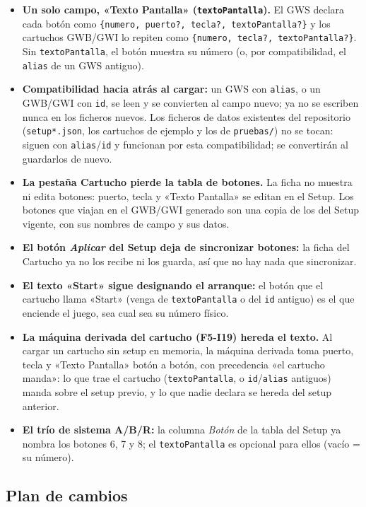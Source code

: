 \begin{itemize}
	\item \textbf{Un solo campo, «Texto Pantalla» (\texttt{textoPantalla}).} El GWS declara cada botón como \texttt{\{numero, puerto?, tecla?, textoPantalla?\}} y los cartuchos GWB/GWI lo repiten como \texttt{\{numero, tecla?, textoPantalla?\}}. Sin \texttt{textoPantalla}, el botón muestra su número (o, por compatibilidad, el \texttt{alias} de un GWS antiguo).
	\item \textbf{Compatibilidad hacia atrás al cargar:} un GWS con \texttt{alias}, o un GWB/GWI con \texttt{id}, se leen y se convierten al campo nuevo; ya no se escriben nunca en los ficheros nuevos. Los ficheros de datos existentes del repositorio (\texttt{setup*.json}, los cartuchos de ejemplo y los de \texttt{pruebas/}) no se tocan: siguen con \texttt{alias}/\texttt{id} y funcionan por esta compatibilidad; se convertirán al guardarlos de nuevo.
	\item \textbf{La pestaña Cartucho pierde la tabla de botones.} La ficha no muestra ni edita botones: puerto, tecla y «Texto Pantalla» se editan en el Setup. Los botones que viajan en el GWB/GWI generado son una copia de los del Setup vigente, con sus nombres de campo y sus datos.
	\item \textbf{El botón \emph{Aplicar} del Setup deja de sincronizar botones:} la ficha del Cartucho ya no los recibe ni los guarda, así que no hay nada que sincronizar.
	\item \textbf{El texto «Start» sigue designando el arranque:} el botón que el cartucho llama «Start» (venga de \texttt{textoPantalla} o del \texttt{id} antiguo) es el que enciende el juego, sea cual sea su número físico.
	\item \textbf{La máquina derivada del cartucho (F5-I19) hereda el texto.} Al cargar un cartucho sin setup en memoria, la máquina derivada toma puerto, tecla y «Texto Pantalla» botón a botón, con precedencia «el cartucho manda»: lo que trae el cartucho (\texttt{textoPantalla}, o \texttt{id}/\texttt{alias} antiguos) manda sobre el setup previo, y lo que nadie declara se hereda del setup anterior.
	\item \textbf{El trío de sistema A/B/R:} la columna \emph{Botón} de la tabla del Setup ya nombra los botones 6, 7 y 8; el \texttt{textoPantalla} es opcional para ellos (vacío = su número).
\end{itemize}

\subsection{Plan de cambios}
\label{sec:F5I22Plan}

